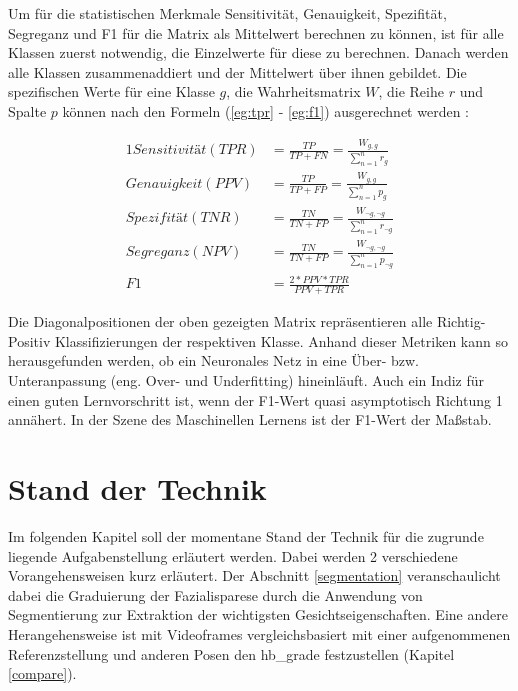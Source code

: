 Um für die statistischen Merkmale Sensitivität, Genauigkeit, Spezifität, Segreganz und F1 für die Matrix als Mittelwert berechnen zu können, ist für alle Klassen zuerst notwendig, die Einzelwerte für diese zu berechnen. Danach werden alle Klassen zusammenaddiert und der Mittelwert über ihnen gebildet. Die spezifischen Werte für eine Klasse $g$, die Wahrheitsmatrix $W$, die Reihe $r$ und Spalte $p$ können nach den Formeln (\ref{eg:tpr} - \ref{eg:f1}) ausgerechnet werden \cite{matrix_calc_paper}:


\begin{alignat}{1}
  Sensitivität (TPR) &= \frac{TP}{TP + FN} = \frac{W_{g, g}}{\sum_{n=1}^{n} r_{g}}                \label{eg:tpr}\\
  Genauigkeit (PPV)  &= \frac{TP}{TP + FP} = \frac{W_{g, g}}{\sum_{n=1}^{n} p_{g}}                \label{eg:ppv}\\
  Spezifität (TNR)   &= \frac{TN}{TN + FP} = \frac{W_{\neg g, \neg g}}{\sum_{n=1}^{n} r_{\neg g}} \label{eg:tnr}\\
  Segreganz (NPV)    &= \frac{TN}{TN + FP} = \frac{W_{\neg g, \neg g}}{\sum_{n=1}^{n} p_{\neg g}} \label{eg:npr}\\
  F1                 &= \frac{2 * PPV * TPR}{PPV + TPR}                                           \label{eg:f1}
\end{alignat}


Die Diagonalpositionen der oben gezeigten Matrix repräsentieren alle Richtig-Positiv Klassifizierungen der respektiven Klasse. Anhand dieser Metriken kann so herausgefunden werden, ob ein Neuronales Netz in eine Über- bzw. Unteranpassung (eng. Over- und Underfitting) hineinläuft. Auch ein Indiz für einen guten Lernvorschritt ist, wenn der F1-Wert quasi asymptotisch Richtung 1 annähert. In der Szene des Maschinellen Lernens ist der F1-Wert der Maßstab.


























\chapter{Stand der Technik}\label{std}
Im folgenden Kapitel soll der momentane  Stand der Technik für die zugrunde liegende Aufgabenstellung erläutert werden. Dabei werden 2 verschiedene Vorangehensweisen kurz erläutert. Der Abschnitt \ref{segmentation} veranschaulicht dabei die Graduierung der Fazialisparese durch die Anwendung von Segmentierung zur Extraktion der wichtigsten Gesichtseigenschaften. Eine andere Herangehensweise ist mit Videoframes vergleichsbasiert mit einer aufgenommenen Referenzstellung und anderen Posen den \ac{hb_grade} festzustellen (Kapitel \ref{compare}).


